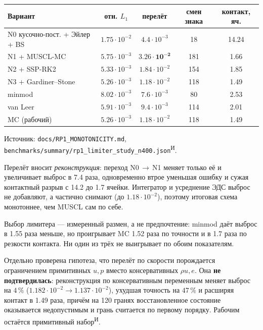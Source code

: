 \documentclass[12pt,a4paper]{article}
\newcommand{\code}[1]{\texttt{#1}}
\newcommand{\Iz}{\textsuperscript{\scriptsize И}}    %
\begin{document}
\begin{center}\footnotesize\setlength{\tabcolsep}{5pt}
\begin{tabular}{lcccc}
\toprule
Вариант & отн. $L_1$ & перелёт & смен знака & контакт, яч. \\
\midrule
N0 кусочно-пост. + Эйлер + BS & $1.75\!\cdot\!10^{-2}$ & $4.4\!\cdot\!10^{-3}$ & 18 & 14.24 \\
N1 {}+ MUSCL-MC               & $5.75\!\cdot\!10^{-3}$ & $\mathbf{3.26\!\cdot\!10^{-2}}$ & 181 & 1.66 \\
N2 {}+ SSP-RK2                & $5.33\!\cdot\!10^{-3}$ & $1.84\!\cdot\!10^{-2}$ & 154 & 1.85 \\
N3 {}+ Gardiner--Stone        & $5.26\!\cdot\!10^{-3}$ & $1.18\!\cdot\!10^{-2}$ & 118 & 1.49 \\
\midrule
minmod                        & $8.02\!\cdot\!10^{-3}$ & $7.6\!\cdot\!10^{-3}$ & 80 & 2.53 \\
van Leer                      & $5.91\!\cdot\!10^{-3}$ & $9.4\!\cdot\!10^{-3}$ & 114 & 2.01 \\
MC (рабочий)                  & $5.26\!\cdot\!10^{-3}$ & $1.18\!\cdot\!10^{-2}$ & 118 & 1.49 \\
\bottomrule
\end{tabular}
\end{center}
\noindent\footnotesize
Источник: \code{docs/RP1\_MONOTONICITY.md},
\code{benchmarks/summary/rp1\_limiter\_study\_n400.json}\Iz.\normalsize

\medskip
Перелёт вносит \emph{реконструкция}: переход N0\,$\to$\,N1 меняет только её и
увеличивает выброс в 7.4 раза, одновременно втрое уменьшая ошибку и сужая
контактный разрыв с 14.2 до 1.7 ячейки. Интегратор и усреднение ЭДС выброс не
добавляют, а частично снимают (до $1.18\!\cdot\!10^{-2}$), поэтому итоговая
схема монотоннее, чем MUSCL сам по себе.

Выбор лимитера --- измеренный размен, а не предпочтение: minmod даёт выброс в
1.55 раза меньше, но проигрывает MC 1.52 раза по точности и в 1.7 раза по
резкости контакта. Ни один из трёх не выигрывает по обоим показателям.

Отдельно проверена гипотеза, что перелёт по скорости порождается ограничением
примитивных $u,p$ вместо консервативных $\rho u, e$. Она \textbf{не
подтвердилась}: реконструкция по консервативным переменным меняет выброс на
$4\,\%$ ($1.182\!\cdot\!10^{-2}\to1.137\!\cdot\!10^{-2}$), ухудшая точность на
$47\,\%$ и расширяя контакт в 1.49 раза, причём на 120 гранях восстановленное
состояние оказывается недопустимым и грань считается по первому порядку.
Рабочим остаётся примитивный набор\Iz.
\end{document}
